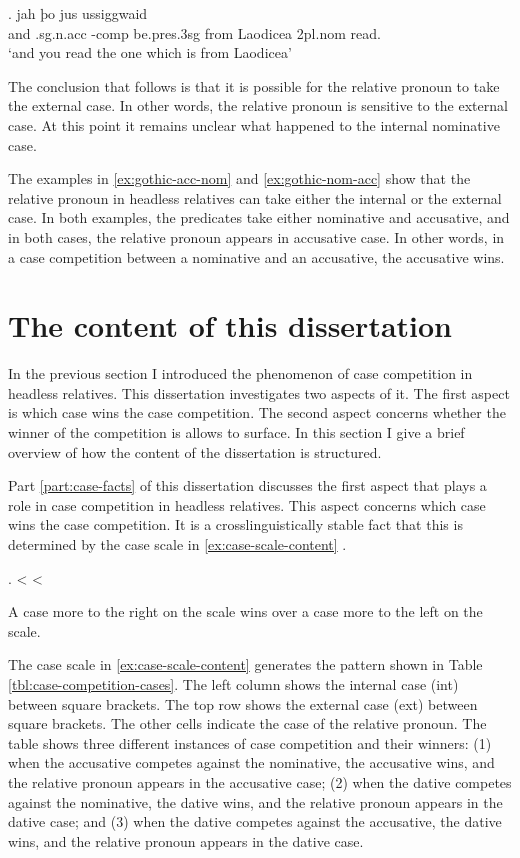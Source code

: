 \exg. jah þo     jus ussiggwaid\\
 and .\ac{sg}.\ac{n}.\ac{acc} -\ac{comp} be.\ac{pres}.3\ac{sg}\scsub{[nom]} from Laodicea 2\ac{pl}.\ac{nom} read.\scsub{[acc]}\\
 `and you read the one which is from Laodicea' \label{ex:gothic-nom-acc}

The conclusion that follows is that it is possible for the relative pronoun to take the external case. In other words, the relative pronoun is sensitive to the external case.
At this point it remains unclear what happened to the internal nominative case.

The examples in \ref{ex:gothic-acc-nom} and \ref{ex:gothic-nom-acc} show that the relative pronoun in headless relatives can take either the internal or the external case. In both examples, the predicates take either nominative and accusative, and in both cases, the relative pronoun appears in accusative case. In other words, in a case competition between a nominative and an accusative, the accusative wins.


\section{The content of this dissertation}

In the previous section I introduced the phenomenon of case competition in headless relatives. This dissertation investigates two aspects of it. The first aspect is which case wins the case competition. The second aspect concerns whether the winner of the competition is allows to surface. In this section I give a brief overview of how the content of the dissertation is structured.

Part \ref{part:case-facts} of this dissertation discusses the first aspect that plays a role in case competition in headless relatives. This aspect concerns which case wins the case competition. It is a crosslinguistically stable fact that this is determined by the case scale in \ref{ex:case-scale-content} \citep[cf.][]{grosu1994}.

\ex.\label{ex:case-scale-content}  <  < 

A case more to the right on the scale wins over a case more to the left on the scale.

The case scale in \ref{ex:case-scale-content} generates the pattern shown in Table \ref{tbl:case-competition-cases}. The left column shows the internal case (\ac{int}) between square brackets. The top row shows the external case (\ac{ext}) between square brackets. The other cells indicate the case of the relative pronoun. The table shows three different instances of case competition and their winners: (1) when the accusative competes against the nominative, the accusative wins, and the relative pronoun appears in the accusative case; (2) when the dative competes against the nominative, the dative wins, and the relative pronoun appears in the dative case; and (3) when the dative competes against the accusative, the dative wins, and the relative pronoun appears in the dative case.

